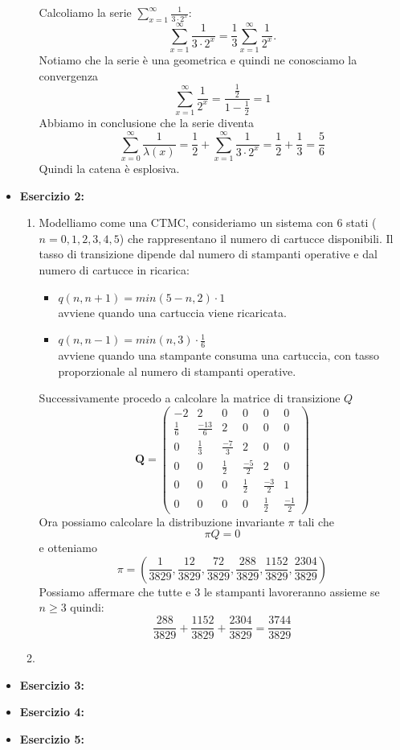 \documentclass[a4paper,12pt]{article}
\begin{document}
\begin{itemize}
\begin{enumerate}[label=\alph*)]
			Calcoliamo la serie \(\sum_{x=1}^\infty \frac{1}{3 \cdot 2^x}\):
			\[
			\sum_{x=1}^\infty \frac{1}{3 \cdot 2^x} = \frac{1}{3} \sum_{x=1}^\infty \frac{1}{2^x}.
			\]
			Notiamo che la serie è una geometrica e quindi ne conosciamo la convergenza\\
			\[
			\sum_{x=1}^\infty \frac{1}{2^x} = \frac{\frac{1}{2}}{1-\frac{1}{2}}=1
			\]
			Abbiamo in conclusione che la serie diventa\\
			\[
			\sum_{x=0}^\infty \frac{1}{\lambda(x)} = \frac{1}{2} + \sum_{x=1}^\infty \frac{1}{3 \cdot 2^x}=\frac{1}{2}+\frac{1}{3}=\frac{5}{6}
			\]
			Quindi la catena è esplosiva.
		\end{enumerate}
		\item \textbf{Esercizio 2: }
		\begin{enumerate}[label=\alph*)]
			\item Modelliamo come una CTMC, consideriamo un sistema con 6 stati ($n=0,1,2,3,4,5$) che rappresentano il numero di cartucce disponibili. Il tasso di transizione dipende dal numero di stampanti operative e dal numero di cartucce in ricarica:\\
			\begin{itemize}
				\item $q(n,n+1)=min(5-n,2) \cdot 1$\\ avviene quando una cartuccia viene ricaricata. 
				\item $q(n,n-1)=min(n,3) \cdot \frac{1}{6}$\\ avviene quando una stampante consuma una cartuccia, con tasso proporzionale al numero di stampanti operative.
			\end{itemize}
			Successivamente procedo a calcolare la matrice di transizione $Q$\\
			\[
			\mathbf{Q} =
			\begin{pmatrix}
				-2 & 2 & 0 & 0 & 0 & 0 \\
				\frac{1}{6} & \frac{-13}{6} & 2 & 0 & 0 & 0 \\
				0 & \frac{1}{3} & \frac{-7}{3} & 2 & 0 & 0 \\
				0 & 0 & \frac{1}{2} & \frac{-5}{2} & 2 & 0 \\
				0 & 0 & 0 & \frac{1}{2} & \frac{-3}{2} & 1 \\
				0 & 0 & 0 & 0 & \frac{1}{2} & \frac{-1}{2}
				
			\end{pmatrix}
			\]
			Ora possiamo calcolare la distribuzione invariante $\pi$ tali che 
			\[
			\pi Q=0
			\]
			e otteniamo\\
			\[
			\pi=(\frac{1}{3829},\frac{12}{3829},\frac{72}{3829},\frac{288}{3829},\frac{1152}{3829},\frac{2304}{3829})
			\]
			Possiamo affermare che tutte e 3 le stampanti lavoreranno assieme se $n\geq 3$ quindi:\\
			\[
			\frac{288}{3829} +\frac{1152}{3829}+\frac{2304}{3829}=\frac{3744}{3829}
			\]
			\item 
		\end{enumerate}
		\item \textbf{Esercizio 3: }
		\item \textbf{Esercizio 4: }
		\item \textbf{Esercizio 5: }
	\end{itemize}
\end{document}

